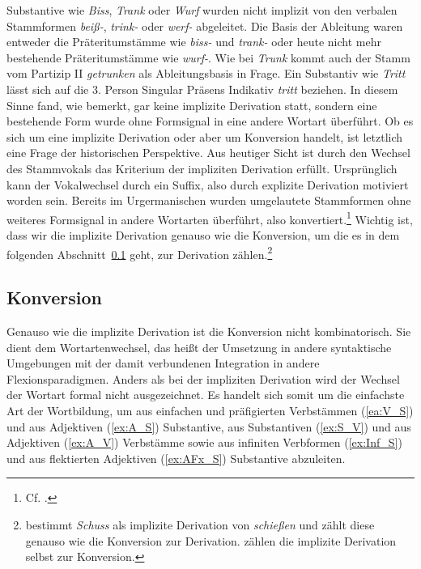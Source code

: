 Substantive wie \textit{Biss}, \textit{Trank} oder \textit{Wurf} wurden nicht implizit von den verbalen Stammformen \textit{beiß-}, \textit{trink-} oder \textit{werf-} abgeleitet. Die Basis der Ableitung waren entweder die Präteritumstämme wie \textit{biss-} und \textit{trank-} oder heute nicht mehr bestehende Präteritumstämme wie \textit{wurf-}. Wie bei \textit{Trunk} kommt auch der Stamm vom Partizip II \textit{getrunken} als Ableitungsbasis in Frage. Ein Substantiv wie \textit{Tritt} lässt sich auf die 3. Person Singular Präsens Indikativ \textit{tritt} beziehen. In diesem Sinne fand, wie \citet[132]{Donalies2005WbÜb} bemerkt, gar keine implizite Derivation statt, sondern eine bestehende Form wurde ohne Formsignal in eine andere Wortart überführt. Ob es sich um eine implizite Derivation oder aber um Konversion handelt, ist letztlich eine Frage der historischen Perspektive. Aus heutiger Sicht ist durch den Wechsel des Stammvokals das Kriterium der impliziten Derivation erfüllt. Ursprünglich kann der Vokalwechsel durch ein Suffix, also durch explizite Derivation motiviert worden sein. Bereits im Urgermanischen wurden umgelautete Stammformen ohne weiteres Formsignal in andere Wortarten überführt, also konvertiert.\footnote{Cf. \citet[78]{Paul1920Wb}.} Wichtig ist, dass wir die implizite Derivation genauso wie die Konversion, um die es in dem folgenden Abschnitt~\ref{subsection:Konversion} geht, zur Derivation zählen.\footnote{\citet[305]{Eisenberg2020_Wort} bestimmt \textit{Schuss} als implizite Derivation von \textit{schießen} und zählt diese genauso wie die Konversion zur Derivation. \citet[89--90]{FleischerBarz2012} zählen die implizite Derivation selbst zur Konversion.}


 \subsection{Konversion}\label{subsection:Konversion}
 
 Genauso wie die implizite Derivation ist die Konversion nicht kombinatorisch. Sie dient dem Wortartenwechsel, das heißt der Umsetzung in andere syntaktische Umgebungen mit der damit verbundenen Integration in andere Flexionsparadigmen. Anders als bei der impliziten Derivation wird der Wechsel der Wortart formal nicht ausgezeichnet. Es handelt sich somit um die einfachste Art der Wortbildung, um aus einfachen und präfigierten Verbstämmen (\ref{ea:V_S}) und aus Adjektiven (\ref{ex:A_S}) Substantive, aus Substantiven (\ref{ex:S_V}) und aus Adjektiven (\ref{ex:A_V}) Verbstämme sowie aus infiniten Verbformen (\ref{ex:Inf_S}) und aus flektierten Adjektiven (\ref{ex:AFx_S}) Substantive abzuleiten. 

